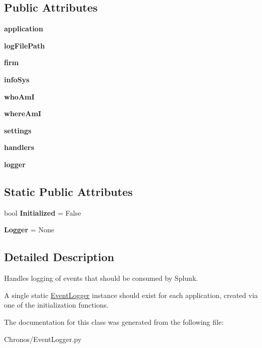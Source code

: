 \subsection*{Public Attributes}
\begin{DoxyCompactItemize}
\item 
{\bfseries application}
\item 
{\bfseries log\+File\+Path}
\item 
{\bfseries firm}
\item 
{\bfseries info\+Sys}
\item 
{\bfseries who\+AmI}
\item 
{\bfseries where\+AmI}
\item 
{\bfseries settings}
\item 
{\bfseries handlers}
\item 
{\bfseries logger}
\end{DoxyCompactItemize}
\subsection*{Static Public Attributes}
\begin{DoxyCompactItemize}
\item 
bool {\bfseries Initialized} = False
\item 
{\bfseries Logger} = None
\end{DoxyCompactItemize}


\subsection{Detailed Description}
Handles logging of events that should be consumed by Splunk. 

A single static \hyperlink{classChronos_1_1EventLogger_1_1EventLogger}{Event\+Logger} instance should exist for each application, created via one of the initialization functions. 

The documentation for this class was generated from the following file\+:\begin{DoxyCompactItemize}
\item 
Chronos/Event\+Logger.\+py\end{DoxyCompactItemize}
